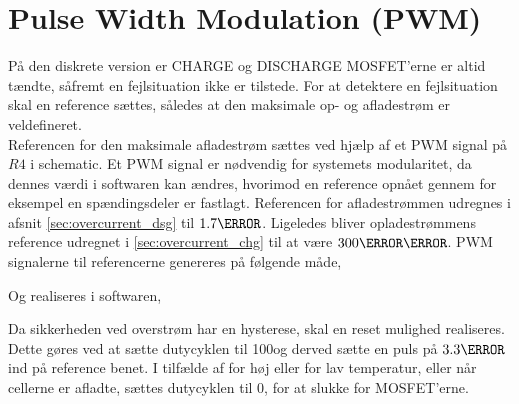\section{Pulse Width Modulation (PWM)}\label{afs:PWM}
På den diskrete version er CHARGE og DISCHARGE MOSFET'erne er altid tændte, såfremt en fejlsituation ikke er tilstede. For at detektere en fejlsituation skal en reference sættes, således at den maksimale op- og afladestrøm er veldefineret.
\\

Referencen for den maksimale afladestrøm sættes ved hjælp af et PWM signal på $R4$ i schematic. Et PWM signal er nødvendig for systemets modularitet, da dennes værdi i softwaren kan ændres, hvorimod en reference opnået gennem for eksempel en spændingsdeler er fastlagt. Referencen for afladestrømmen udregnes i afsnit \ref{sec:overcurrent_dsg} til $1.7\volt$. Ligeledes bliver opladestrømmens reference udregnet i \ref{sec:overcurrent_chg} til at være $300\milli\volt$. PWM signalerne til referencerne genereres på følgende måde,


Og realiseres i softwaren,


Da sikkerheden ved overstrøm har en hysterese, skal en reset mulighed realiseres. Dette gøres ved at sætte dutycyklen til 100\percent\space og derved sætte en puls på $3.3\volt$ ind på reference benet. I tilfælde af for høj eller for lav temperatur, eller når cellerne er afladte, sættes dutycyklen til 0\percent, for at slukke for MOSFET'erne.


